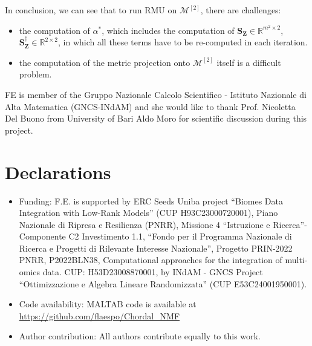 \documentclass[sn-mathphys-num]{sn-jnl}
\def\IR  {\mathbb{R}} 	    %
\def\S {\bm{S}}
\def\Z {\bm{Z}}
\def\cM { \mathcal{M}}
\begin{document}
In conclusion, we can see that to run RMU on $\cM^{[2]}$, there are challenges: 
\begin{itemize}
\item the computation of $\alpha^*$, which includes the computation of $\S_{\Z} \in \IR^{m^2 \times 2}$, 
$\S_{\Z}^{\dagger} \in \IR^{ 2 \times 2}$, in which all these terms have to be re-computed in each iteration.

\item the computation of the metric projection onto $\cM^{[2]}$ itself is a difficult problem.
\end{itemize}


\backmatter

FE is member of the Gruppo Nazionale Calcolo Scientifico - Istituto Nazionale di Alta Matematica (GNCS-INdAM) and she would like to thank Prof. Nicoletta Del Buono from University of Bari Aldo Moro for scientific discussion during this project.

\section*{Declarations}

\begin{itemize}
\item Funding:
F.E. is supported by ERC Seeds Uniba project ``Biomes Data Integration with Low-Rank Models'' (CUP H93C23000720001), Piano Nazionale di Ripresa e Resilienza (PNRR), Missione 4 ``Istruzione e Ricerca''-Componente C2 Investimento 1.1, ``Fondo per il Programma Nazionale di Ricerca e Progetti di Rilevante Interesse Nazionale'', Progetto PRIN-2022 PNRR, P2022BLN38, Computational approaches for the integration of multi-omics data. CUP: H53D23008870001, by INdAM - GNCS Project ``Ottimizzazione e Algebra Lineare Randomizzata'' (CUP E53C24001950001).

\item Code availability: 
MALTAB code is available at \url{https://github.com/flaespo/Chordal_NMF}

\item Author contribution: 
All authors contribute equally to this work.
\end{itemize}


\end{document}

